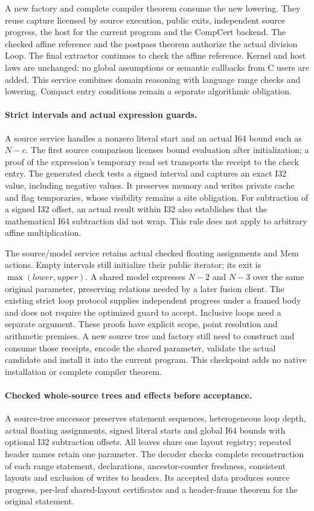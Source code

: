 A new factory and complete compiler theorem consume the new lowering. They
reuse capture licensed by source execution, public exits, independent source
progress, the host for the current program and the CompCert backend. The checked
affine reference and the postpass theorem authorize the actual division Loop.
The final extractor continues to check the affine reference. Kernel and host
laws are unchanged; no global assumptions or semantic callbacks from C users
are added. This service combines domain reasoning with language range checks
and lowering. Compact entry conditions remain a separate algorithmic obligation.

\paragraph{Strict intervals and actual expression guards.}
A source service handles a nonzero literal start and an actual I64 bound such
as $N-c$. The first source comparison licenses bound evaluation after
initialization; a proof of the expression's temporary read set transports the
receipt to the check entry. The generated check tests a signed interval and
captures an exact I32 value, including negative values. It preserves memory and
writes private cache and flag temporaries, whose visibility remains a site
obligation. For subtraction of a signed I32 offset, an actual result within I32
also establishes that the mathematical I64 subtraction did not wrap. This rule
does not apply to arbitrary affine multiplication.

The source/model service retains actual checked floating assignments and Mem
actions. Empty intervals still initialize their public iterator; its exit is
$\max(lower,upper)$. A shared model expresses $N-2$ and $N-3$ over the same original
parameter, preserving relations needed by a later fusion client. The existing
strict loop protocol supplies independent progress under a framed body and
does not require the optimized guard to accept. Inclusive loops need a separate
argument. These proofs have explicit scope, point resolution and arithmetic
premises. A new source tree and factory still need to construct and consume
those receipts, encode the shared parameter, validate the actual candidate and
install it into the current program. This checkpoint adds no native installation
or complete compiler theorem.

\paragraph{Checked whole-source trees and effects before acceptance.}
A source-tree successor preserves statement sequences, heterogeneous loop depth,
actual floating assignments, signed literal starts and global I64 bounds with
optional I32 subtraction offsets. All leaves share one layout registry; repeated
header names retain one parameter. The decoder checks complete reconstruction
of each range statement, declarations, ancestor-counter freshness, consistent
layouts and exclusion of writes to headers. Its accepted data produces source
progress, per-leaf shared-layout certificates and a header-frame theorem for
the original statement.

